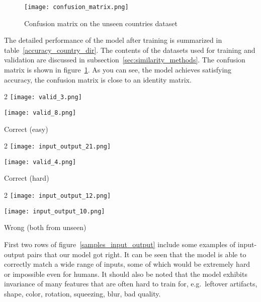 \documentclass[twocolumn]{svjour3}
\begin{document}
\begin{figure}
    \texttt{[image: confusion\_matrix.png]}
    \caption{Confusion matrix on the unseen countries dataset}
    \label{confusion_matrix}
\end{figure}

The detailed performance of the model after training is summarized in
table~\ref{accuracy_country_dir}. The contents of the datasets used for training and validation are discussed in subsection~\ref{sec:similarity_methods}.
The confusion matrix is shown in figure~\ref{confusion_matrix}. As you can see, the model achieves satisfying accuracy, the confusion matrix is close to an identity matrix.

\begin{figure*}
    \centering
    \begin{multicols}{2}
        \texttt{[image: valid\_3.png]}\par
        \texttt{[image: valid\_8.png]}\par
    \end{multicols}
    Correct (easy)\par
    \begin{multicols}{2}
        \texttt{[image: input\_output\_21.png]}\par
        \texttt{[image: valid\_4.png]}\par
    \end{multicols}
    Correct (hard)\par
    \begin{multicols}{2}
        \texttt{[image: input\_output\_12.png]}\par
        \texttt{[image: input\_output\_10.png]}\par
    \end{multicols}
    Wrong (both from unseen)
    \caption{Samples of input-output image pairs}
    \label{samples_input_output}
\end{figure*}

First two rows of figure~\ref{samples_input_output} include some examples of input-output pairs that our model got right. It can be seen that the model is able to correctly match a wide range of inputs, some of which would be extremely hard or impossible even for humans. It should also be noted that the model exhibits invariance of many features that are often hard to train for, e.g.\ leftover artifacts, shape, color, rotation, squeezing, blur, bad quality.
\end{document}
